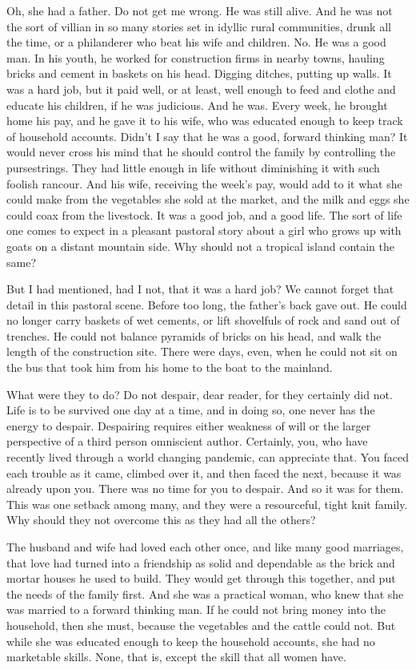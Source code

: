 \documentclass{amsart}
\begin{document}
Oh, she had a father. Do not get me wrong. He was still alive. And he was not the sort of villian in so many stories set in idyllic rural communities, drunk all the time, or a philanderer who beat his wife and children. No. He was a good man. In his youth, he worked for construction firms in nearby towns, hauling bricks and cement in baskets on his head. Digging ditches, putting up walls. It was a hard job, but it paid well, or at least, well enough to feed and clothe and educate his children, if he was judicious. And he was. Every week, he brought home his pay, and he gave it to his wife, who was educated enough to keep track of household accounts. Didn't I say that he was a good, forward thinking man? It would never cross his mind that he should control the family by controlling the pursestrings. They had little enough in life without diminishing it with such foolish rancour. And his wife, receiving the week's pay, would add to it what she could make from the vegetables she sold at the market, and the milk  and eggs she could coax from the livestock. It was a good job, and a good life. The sort of life one comes to expect in a pleasant pastoral story about a girl who grows up with goats on a distant mountain side. Why should not a tropical island contain the same?

But I had mentioned, had I not, that it was a hard job? We cannot forget that detail in this pastoral scene. Before too long, the father's back gave out. He could no longer carry baskets of wet cements, or lift shovelfuls of rock and sand out of trenches. He could not balance pyramids of bricks on his head, and walk the length of the construction site. There were days, even, when he could not sit on the bus that took him from his home to the boat to the mainland.

What were they to do? Do not despair, dear reader, for they certainly did not. Life is to be survived one day at a time, and in doing so, one never has the energy to despair. Despairing requires either weakness of will or the larger perspective of a third person omniscient author. Certainly, you, who have recently lived through a world changing pandemic, can appreciate that. You faced each trouble as it came, climbed over it, and then faced the next, because it was already upon you. There was no time for you to despair. And so it was for them. This was one setback among many, and they were a resourceful, tight knit family. Why should they not overcome this as they had all the others?

The husband and wife had loved each other once, and like many good marriages, that love had turned into a friendship as solid and dependable as the brick and mortar houses he used to build. They would get through this together, and put the needs of the family first. And she was a practical woman, who knew that she was married to a forward thinking man. If he could not bring money into the household, then she must, because the vegetables and the cattle could not. But while she was educated enough to keep the household accounts, she had no marketable skills. None, that is, except the skill that all women have. 
\end{document}
